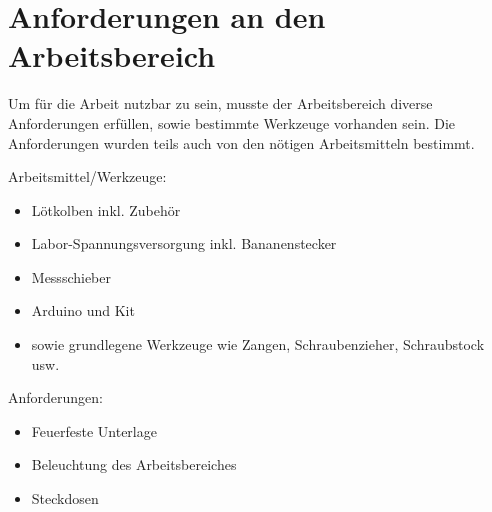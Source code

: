 \section{Anforderungen an den Arbeitsbereich}

Um für die Arbeit nutzbar zu sein, musste der Arbeitsbereich diverse Anforderungen erfüllen, sowie bestimmte Werkzeuge vorhanden sein.
Die Anforderungen wurden teils auch von den nötigen Arbeitsmitteln bestimmt.

Arbeitsmittel/Werkzeuge:

\begin{itemize}
    \item Lötkolben inkl. Zubehör
    \item Labor-Spannungsversorgung inkl. Bananenstecker
    \item Messschieber
    \item Arduino und Kit 
    \item sowie grundlegene Werkzeuge wie Zangen, Schraubenzieher, Schraubstock usw.
\end{itemize}

Anforderungen: 

\begin{itemize}
    \item Feuerfeste Unterlage
    \item Beleuchtung des Arbeitsbereiches
    \item Steckdosen
\end{itemize}